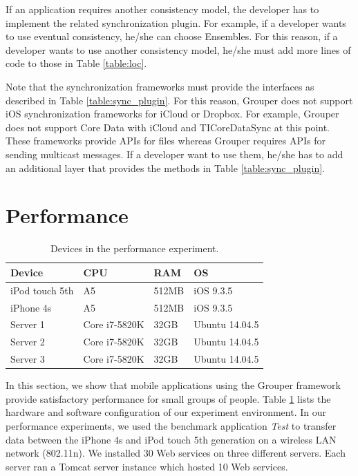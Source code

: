 \documentclass[a4paper,11pt]{report}
\begin{document}
If an application requires another consistency model, the developer has to implement the related synchronization plugin.
For example, if a developer wants to use eventual consistency, he/she can choose Ensembles\cite{ensembles}.
For this reason, if a developer wants to use another consistency model, he/she must add more lines of code to those in Table \ref{table:loc}.

Note that the synchronization frameworks must provide the interfaces as described in Table \ref{table:sync_plugin}.
For this reason, Grouper does not support iOS synchronization frameworks for iCloud or Dropbox.
For example, Grouper does not support Core Data with iCloud\cite{coredata} and TICoreDataSync\cite{ticoredatasyn} at this point.
These frameworks provide APIs for files whereas Grouper requires APIs for sending multicast messages.
If a developer want to use them, he/she has to add an additional layer that provides the methods in Table \ref{table:sync_plugin}.

\section{Performance} \label{section:performance}

\begin{table}[t]
	\centering
	\caption{Devices in the performance experiment.}
	\label{table:experiment_devices}
	\begin{tabular}{llll}
		\toprule
		\textbf{Device} & \textbf{CPU} & \textbf{RAM} & \textbf{OS} \\ 
		\midrule
		iPod touch 5th & A5 & 512MB & iOS 9.3.5 \\
		iPhone 4s & A5 & 512MB & iOS 9.3.5 \\
		Server 1 & Core i7-5820K & 32GB & Ubuntu 14.04.5 \\
		Server 2 & Core i7-5820K & 32GB & Ubuntu 14.04.5 \\
		Server 3 & Core i7-5820K & 32GB & Ubuntu 14.04.5 \\ 
		\bottomrule
	\end{tabular}
\end{table}

In this section, we show that mobile applications using the Grouper framework provide satisfactory performance for small groups of people.
Table \ref{table:experiment_devices} lists the hardware and software configuration of our experiment environment.
In our performance experiments, we used the benchmark application \emph{Test} to transfer data between the iPhone 4s and iPod touch 5th generation on a wireless LAN network (802.11n).
We installed 30 Web services on three different servers.
Each server ran a Tomcat server instance which hosted 10 Web services.
\end{document}
